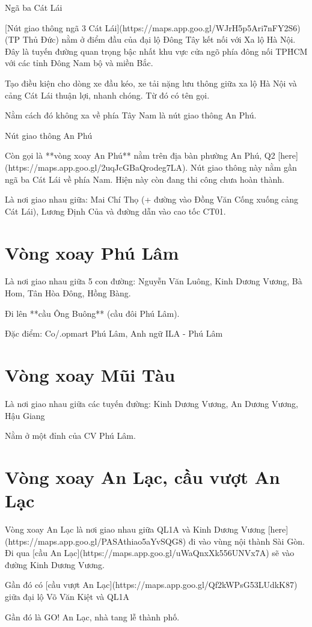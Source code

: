 Ngã ba Cát Lái

[Nút giao thông ngã 3 Cát Lái](https://maps.app.goo.gl/WJrH5p5Ari7nFY2S6) (TP Thủ Đức) nằm ở điểm đầu của đại lộ Đông Tây kết nối với Xa lộ Hà Nội. Đây là tuyến đường quan trọng bậc nhất khu vực cửa ngõ phía đông nối TP\.HCM với các tỉnh Đông Nam bộ và miền Bắc.

Tạo điều kiện cho dòng xe đầu kéo, xe tải nặng lưu thông giữa xa lộ Hà Nội và cảng Cát Lái thuận lợi, nhanh chóng. Từ đó có tên gọi.

Nằm cách đó không xa về phía Tây Nam là nút giao thông An Phú.

Nút giao thông An Phú

Còn gọi là **vòng xoay An Phú** nằm trên địa bàn phường An Phú, Q2 [here](https://maps.app.goo.gl/2uqJcGBaQrodeg7LA). Nút giao thông này nằm gần ngã ba Cát Lái về phía Nam. Hiện này còn đang thi công chưa hoàn thành.

Là nơi giao nhau giữa: Mai Chí Thọ (+ đường vào Đồng Văn Cống xuống cảng Cát Lái), Lương Định Của và đường dẫn vào cao tốc CT01.

\section{Vòng xoay Phú Lâm}

Là nơi giao nhau giữa 5 con đường: Nguyễn Văn Luông, Kinh Dương Vương, Bà Hom, Tân Hòa Đông, Hồng Bàng.

Đi lên **cầu Ông Buông** (cầu đôi Phú Lâm).

Đặc điểm: Co/.opmart Phú Lâm, Anh ngữ ILA - Phú Lâm

\section{Vòng xoay Mũi Tàu}

 Là nơi giao nhau giữa các tuyến đường: Kinh Dương Vương, An Dương Vương, Hậu Giang

Nằm ở một đỉnh của CV Phú Lâm.

\section{Vòng xoay An Lạc, cầu vượt An Lạc}

Vòng xoay An Lạc là nơi giao nhau giữa QL1A và Kinh Dương Vương [here](https://maps.app.goo.gl/PASAthiao5aYvSQG8) đi vào vùng nội thành Sài Gòn. Đi qua [cầu An Lạc](https://maps.app.goo.gl/uWaQnxXk556UNVx7A) sẽ vào đường Kinh Dương Vương.

Gần đó có [cầu vượt An Lạc](https://maps.app.goo.gl/Qf2kWPsG53LUdkK87) giữa đại lộ Võ Văn Kiệt và QL1A

Gần đó là GO! An Lạc, nhà tang lễ thành phố.

